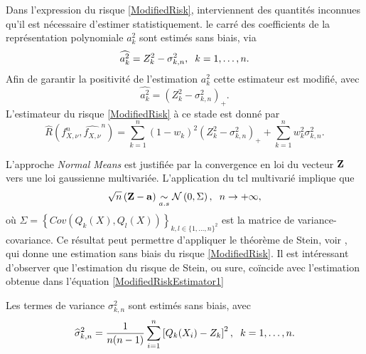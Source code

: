 Dans l\rq{}expression du risque \eqref{ModifiedRisk}, interviennent des quantités inconnues qu'il est nécessaire d'estimer statistiquement. le carré des coefficients de la représentation polynomiale $a_{k}^{2}$ sont estimés sans biais, via
\begin{equation*}
\widehat{a_{k}^{2}}=Z_{k}^{2}-\sigma_{k,n}^{2},\hspace{0.2cm}k=1,\ldots,n.
\end{equation*}
Afin de garantir la positivité de l'estimation $a_{k}^{2}$ cette estimateur est modifié, avec
\begin{equation*}
\widehat{a_{k}^{2}}=\left(Z_{k}^{2}-\sigma_{k,n}^{2}\right)_{+}.
\end{equation*}
L'estimateur du risque \eqref{ModifiedRisk} à ce stade est donné par 
\begin{equation}\label{ModifiedRiskEstimator1}
\widehat{R}\left(f_{X,\nu}^{n},\widehat{f_{X,\nu}}^{n} \right)=\sum_{k=1}^{n}(1-w_{k})^{2}\left(Z_{k}^{2}-\sigma_{k,n}^{2}\right)_{+}+\sum_{k=1}^{n}w_{k}^{2}\sigma_{k,n}^{2}.
\end{equation}
\begin{Rk}
L'approche \textit{Normal Means} est justifiée par la convergence en loi du vecteur $\bold{Z}$ vers une loi gaussienne multivariée. L'application du \gls{tcl} multivarié implique que 
\begin{equation}
\sqrt{n}\left(\bold{Z}-\bold{a}\right)\underset{a.s}{\sim}\mathcal{N}\left(0,\Sigma\right),\hspace{0.2cm} n\rightarrow+\infty,
\end{equation}
où $\Sigma=\left\{Cov\left(Q_{k}(X),Q_{l}(X)\right)\right\}_{k,l\in\{1,\ldots,n\}^{2}}$ est la matrice de variance-covariance. Ce résultat peut permettre d'appliquer le théorème de Stein, voir \citet{St81}, qui donne une estimation sans biais du risque \eqref{ModifiedRisk}. Il est intéressant d'observer que l'estimation du risque de Stein, ou \gls{sure}, coïncide avec l'estimation obtenue dans l'équation \eqref{ModifiedRiskEstimator1}
\end{Rk}
Les termes de variance $\sigma_{k,n}^{2}$ sont estimés sans biais, avec 
\begin{equation}\label{VarianceEstimation}
\widehat{\sigma}_{k,n}^{2}=\frac{1}{n(n-1)}\sum_{i=1}^{n}\left[Q_{k}(X_{i})-Z_{k}\right]^{2},\hspace{0.2cm}k=1,\ldots,n.
\end{equation}
